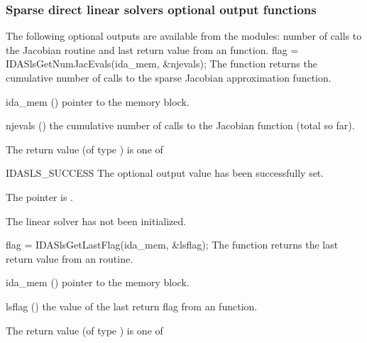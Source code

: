 {%
\subsubsection{Sparse direct linear solvers optional output functions}\label{sss:optout_sls}
The following optional outputs are available from the {\idasls} modules:
number of calls to the Jacobian routine and last return value from an
{\idasls} function.
{
  flag = IDASlsGetNumJacEvals(ida\_mem, \&njevals);
}
{
  The function  returns the
  cumulative number of calls to the {\idasls} sparse
  Jacobian approximation function.
}
{
  \begin{args}[njevals]
  \item[ida\_mem] ()
    pointer to the {\idas} memory block.
  \item[njevals] ()
    the cumulative number of calls to the Jacobian function (total so far).
  \end{args}
}
{
  The return value  (of type ) is one of
  \begin{args}
  \item[IDASLS\_SUCCESS] 
    The optional output value has been successfully set.
  \item[\Id{IDASLS\_MEM\_NULL}]
    The  pointer is .
  \item[\Id{IDASLS\_LMEM\_NULL}]
    The {\idasls} linear solver has not been initialized.
  \end{args}
}
{}
{
  flag = IDASlsGetLastFlag(ida\_mem, \&lsflag);
}
{
  The function  returns the
  last return value from an {\idasls} routine. 
}
{
  \begin{args}
  \item[ida\_mem] ()
    pointer to the {\idas} memory block.
  \item[lsflag] ()
    the value of the last return flag from an {\idasls} function.
  \end{args}
}
{
  The return value  (of type ) is one of
  \begin{args}
  \item[\Id{IDASLS\_SUCCESS}] 

\end{args}}}
